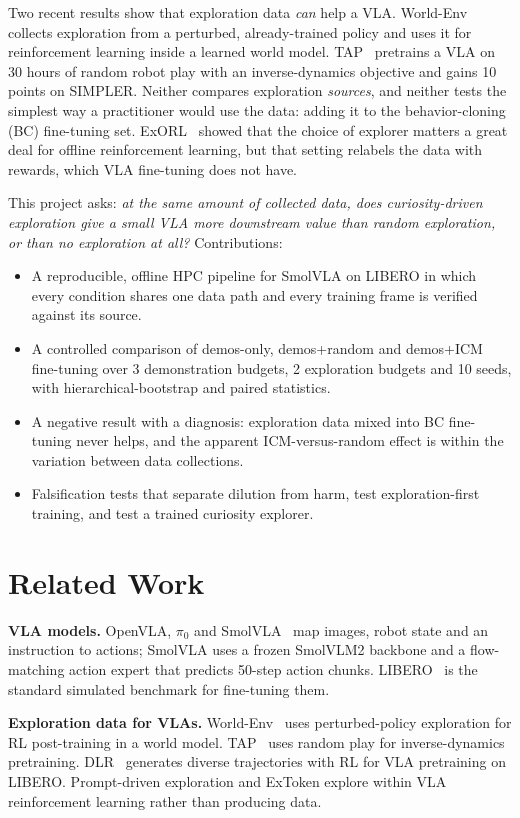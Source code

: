 \documentclass[conference]{IEEEtran}
\begin{document}
Two recent results show that exploration data \emph{can} help a VLA. World-Env~\cite{worldenv} collects exploration from a perturbed, already-trained policy and uses it for reinforcement learning inside a learned world model. TAP~\cite{tap} pretrains a VLA on 30 hours of random robot play with an inverse-dynamics objective and gains 10 points on SIMPLER. Neither compares exploration \emph{sources}, and neither tests the simplest way a practitioner would use the data: adding it to the behavior-cloning (BC) fine-tuning set. ExORL~\cite{exorl} showed that the choice of explorer matters a great deal for offline reinforcement learning, but that setting relabels the data with rewards, which VLA fine-tuning does not have.

This project asks: \emph{at the same amount of collected data, does curiosity-driven exploration give a small VLA more downstream value than random exploration, or than no exploration at all?} Contributions:
\begin{itemize}
\item A reproducible, offline HPC pipeline for SmolVLA on LIBERO in which every condition shares one data path and every training frame is verified against its source.
\item A controlled comparison of demos-only, demos+random and demos+ICM fine-tuning over 3 demonstration budgets, 2 exploration budgets and 10 seeds, with hierarchical-bootstrap and paired statistics.
\item A negative result with a diagnosis: exploration data mixed into BC fine-tuning never helps, and the apparent ICM-versus-random effect is within the variation between data collections.
\item Falsification tests that separate dilution from harm, test exploration-first training, and test a trained curiosity explorer.
\end{itemize}

\section{Related Work}
\textbf{VLA models.} OpenVLA, $\pi_0$ and SmolVLA~\cite{smolvla} map images, robot state and an instruction to actions; SmolVLA uses a frozen SmolVLM2 backbone and a flow-matching action expert that predicts 50-step action chunks. LIBERO~\cite{libero} is the standard simulated benchmark for fine-tuning them.

\textbf{Exploration data for VLAs.} World-Env~\cite{worldenv} uses perturbed-policy exploration for RL post-training in a world model. TAP~\cite{tap} uses random play for inverse-dynamics pretraining. DLR~\cite{dlr} generates diverse trajectories with RL for VLA pretraining on LIBERO. Prompt-driven exploration and ExToken explore within VLA reinforcement learning rather than producing data.
\end{document}
